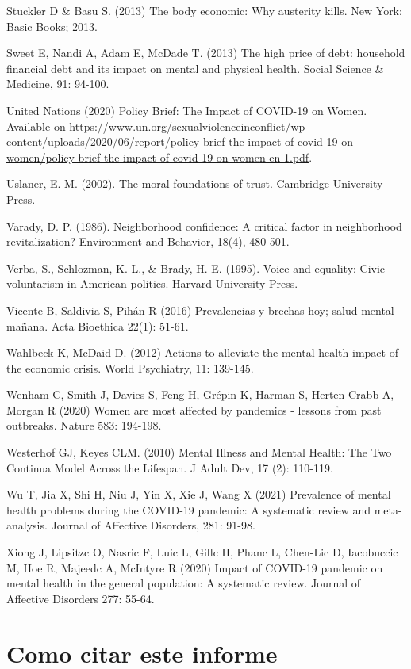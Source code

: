 \documentclass[
  12pt,
]{book}
\begin{document}
Stuckler D \& Basu S. (2013) The body economic: Why austerity kills. New York: Basic Books; 2013.

Sweet E, Nandi A, Adam E, McDade T. (2013) The high price of debt: household financial debt and its impact on mental and physical health. Social Science \& Medicine, 91: 94-100.

United Nations (2020) Policy Brief: The Impact of COVID-19 on Women. Available on \url{https://www.un.org/sexualviolenceinconflict/wp-content/uploads/2020/06/report/policy-brief-the-impact-of-covid-19-on-women/policy-brief-the-impact-of-covid-19-on-women-en-1.pdf}.

Uslaner, E. M. (2002). The moral foundations of trust. Cambridge University Press.

Varady, D. P. (1986). Neighborhood confidence: A critical factor in neighborhood revitalization? Environment and Behavior, 18(4), 480-501.

Verba, S., Schlozman, K. L., \& Brady, H. E. (1995). Voice and equality: Civic voluntarism in American politics. Harvard University Press.

Vicente B, Saldivia S, Pihán R (2016) Prevalencias y brechas hoy; salud mental mañana. Acta Bioethica 22(1): 51-61.

Wahlbeck K, McDaid D. (2012) Actions to alleviate the mental health impact of the economic crisis. World Psychiatry, 11: 139-145.

Wenham C, Smith J, Davies S, Feng H, Grépin K, Harman S, Herten-Crabb A, Morgan R (2020) Women are most affected by pandemics - lessons from past outbreaks. Nature 583: 194-198.

Westerhof GJ, Keyes CLM. (2010) Mental Illness and Mental Health: The Two Continua Model Across the Lifespan. J Adult Dev, 17 (2): 110-119.

Wu T, Jia X, Shi H, Niu J, Yin X, Xie J, Wang X (2021) Prevalence of mental health problems during the COVID-19 pandemic: A systematic review and meta-analysis. Journal of Affective Disorders, 281: 91-98.

Xiong J, Lipsitzc O, Nasric F, Luic L, Gillc H, Phanc L, Chen-Lic D, Iacobuccic M, Hoe R, Majeedc A, McIntyre R (2020) Impact of COVID-19 pandemic on mental health in the general population: A systematic review. Journal of Affective Disorders 277: 55-64.

\hypertarget{como-citar-este-informe}{%
\chapter*{Como citar este informe}\label{como-citar-este-informe}}
\end{document}
